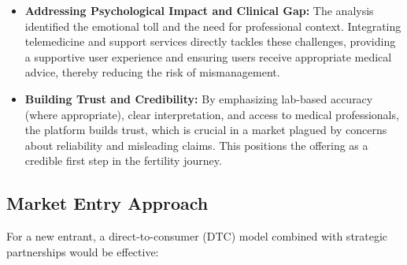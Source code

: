 \documentclass{article}
\begin{document}
\begin{itemize}
    \item \textbf{Addressing Psychological Impact and Clinical Gap:} The analysis identified the emotional toll and the need for professional context. Integrating telemedicine and support services directly tackles these challenges, providing a supportive user experience and ensuring users receive appropriate medical advice, thereby reducing the risk of mismanagement.
\item \textbf{Building Trust and Credibility:} By emphasizing lab-based accuracy (where appropriate), clear interpretation, and access to medical professionals, the platform builds trust, which is crucial in a market plagued by concerns about reliability and misleading claims. This positions the offering as a credible first step in the fertility journey.
\end{itemize}

\subsection{Market Entry Approach}

For a new entrant, a direct-to-consumer (DTC) model combined with strategic partnerships would be effective:
\end{document}

